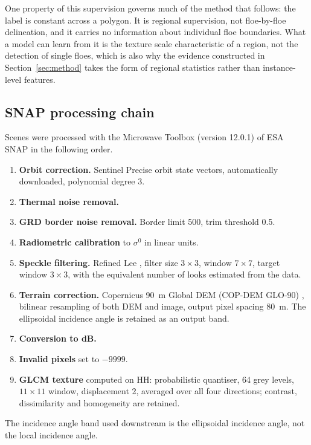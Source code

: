 \documentclass[preprint,12pt,authoryear]{elsarticle}
\begin{document}
One property of this supervision governs much of the method that follows: the
label is constant across a polygon. It is regional supervision, not
floe-by-floe delineation, and it carries no information about individual floe
boundaries. What a model can learn from it is the texture scale characteristic
of a region, not the detection of single floes, which is also why the
evidence constructed in Section~\ref{sec:method} takes the form of regional
statistics rather than instance-level features.

\subsection{SNAP processing chain}

Scenes were processed with the Microwave Toolbox (version 12.0.1) of ESA SNAP
\citep{esa2025snap} in the following order.
\begin{enumerate}
\item \textbf{Orbit correction.} Sentinel Precise orbit state vectors,
      automatically downloaded, polynomial degree 3.
\item \textbf{Thermal noise removal.}
\item \textbf{GRD border noise removal.} Border limit 500, trim threshold 0.5.
\item \textbf{Radiometric calibration} to $\sigma^0$ in linear units.
\item \textbf{Speckle filtering.} Refined Lee \citep{lee1981refined}, filter
      size $3\times3$, window $7\times7$, target window $3\times3$, with the
      equivalent number of looks estimated from the data.
\item \textbf{Terrain correction.} Copernicus 90~m Global DEM (COP-DEM GLO-90)
      \citep{opentopography2021copdem}, bilinear resampling of both DEM and
      image, output pixel spacing 80~m. The ellipsoidal incidence angle is
      retained as an output band.
\item \textbf{Conversion to dB.}
\item \textbf{Invalid pixels} set to $-9999$.
\item \textbf{GLCM texture} \citep{haralick1973textural} computed on HH:
      probabilistic quantiser, 64 grey levels, $11\times11$ window,
      displacement 2, averaged over all four directions; contrast,
      dissimilarity and homogeneity are retained.
\end{enumerate}
The incidence angle band used downstream is the ellipsoidal incidence
angle, not the local incidence angle.
\end{document}
